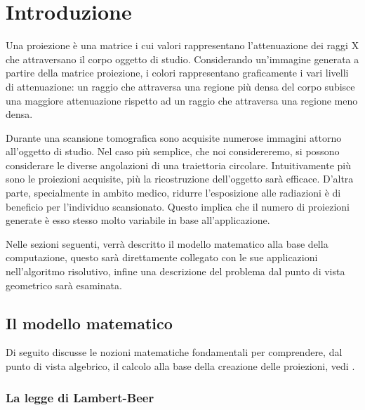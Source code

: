 \documentclass[12pt,a4paper]{report}
\begin{document}
\pagestyle{fancy}
\tableofcontents
\clearpage

\pagestyle{fancy}
\newpage
{}

\chapter{Introduzione}

Una proiezione è una matrice i cui valori rappresentano l'attenuazione dei raggi X che attraversano il corpo oggetto di studio.
Considerando un'immagine generata a partire della matrice proiezione, i colori rappresentano graficamente i vari livelli di
attenuazione: un raggio che attraversa una regione più densa del corpo subisce una maggiore attenuazione rispetto ad un
raggio che attraversa una regione meno densa.

Durante una scansione tomografica sono acquisite numerose immagini attorno all'oggetto di studio.
Nel caso più semplice, che noi considereremo, si possono considerare le diverse angolazioni di una traiettoria circolare.
Intuitivamente più sono le proiezioni acquisite, più la ricostruzione dell'oggetto sarà efficace.
D'altra parte, specialmente in ambito medico, ridurre l'esposizione alle radiazioni è di beneficio per l'individuo scansionato.
Questo implica che il numero di proiezioni generate è esso stesso molto variabile in base all'applicazione.

Nelle sezioni seguenti, verrà descritto il modello matematico alla base della computazione, questo sarà direttamente collegato con
le sue applicazioni nell'algoritmo risolutivo, infine una descrizione del problema dal punto di vista geometrico sarà
esaminata.

\section{Il modello matematico}

Di seguito discusse le nozioni matematiche fondamentali per comprendere, dal punto di vista algebrico, il calcolo
alla base della creazione delle proiezioni, vedi \cite{MoroLoli2021}.

\subsection{La legge di Lambert-Beer}
\end{document}
